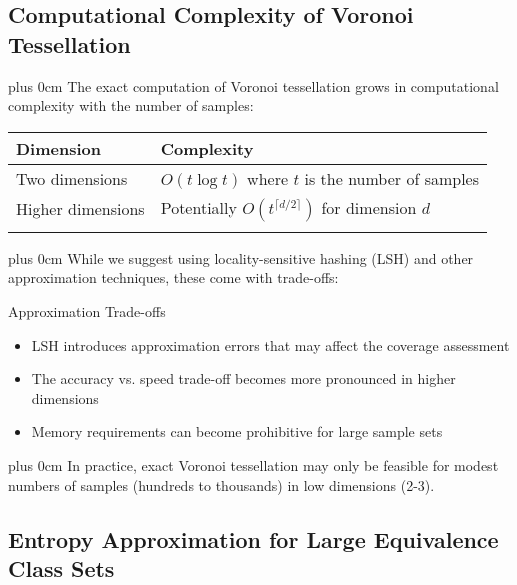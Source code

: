 \documentclass[conference]{IEEEtran}
\newcommand{\justifytext}{\leftskip=0pt \rightskip=0pt plus 0cm}
\newcommand{\tabletitlecolor}{blue!70!black}
\newcommand{\tableheader}[1]{\cellcolor{tablerow1}\textbf{\large #1}}
\begin{document}
\subsection{Computational Complexity of Voronoi Tessellation}

\justifytext
The exact computation of Voronoi tessellation grows in computational complexity with the number of samples:

\begin{tcolorbox}[
  enhanced,
  colback=white,
  colframe=\tabletitlecolor,
  arc=0mm,
  boxrule=0.5pt,
  left=0pt,
  right=0pt,
  top=2pt,
  bottom=2pt,
  boxsep=0pt,
  width=\textwidth
]
\vspace{1mm}
\begin{tabularx}{\textwidth}{>{\raggedright\arraybackslash}X|>{\raggedright\arraybackslash}X}
\tableheader{Dimension} & \tableheader{Complexity} \\
\hline
\addlinespace[3pt]
Two dimensions & $O(t \log t)$ where $t$ is the number of samples \\
\addlinespace[3pt]
\hline
\addlinespace[3pt]

Higher dimensions & Potentially $O(t^{\lceil d/2 \rceil})$ for dimension $d$ \\
\addlinespace[3pt]
\end{tabularx}
\vspace{1mm}
\end{tcolorbox}

\justifytext
While we suggest using locality-sensitive hashing (LSH) and other approximation techniques, these come with trade-offs:

\begin{alertbox}{Approximation Trade-offs}
\begin{itemize}
\item LSH introduces approximation errors that may affect the coverage assessment
\item The accuracy vs. speed trade-off becomes more pronounced in higher dimensions
\item Memory requirements can become prohibitive for large sample sets
\end{itemize}
\end{alertbox}

\justifytext
In practice, exact Voronoi tessellation may only be feasible for modest numbers of samples (hundreds to thousands) in low dimensions (2-3).

\subsection{Entropy Approximation for Large Equivalence Class Sets}
\end{document}
